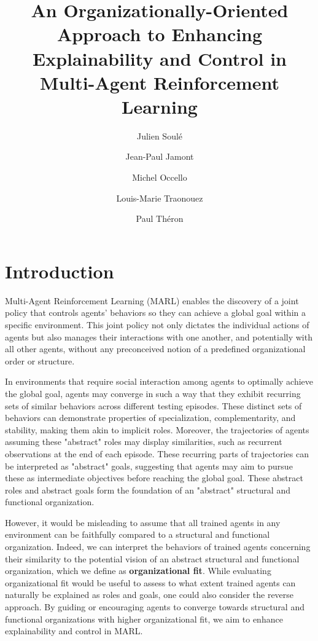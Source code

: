 \documentclass[sigconf,anonymous]{aamas}
\title[AAMAS-2025 CybMASDE]{An Organizationally-Oriented Approach to Enhancing Explainability and Control in Multi-Agent Reinforcement Learning}
\author{Julien Soulé}
\affiliation{
  \institution{Univ. Grenoble Alpes}
  \city{Valence}
  \country{France}}
\author{Jean-Paul Jamont}
\affiliation{
  \institution{Univ. Grenoble Alpes}
  \city{Valence}
  \country{France}}
\author{Michel Occello}
\affiliation{
  \institution{Univ. Grenoble Alpes}
  \city{Valence}
  \country{France}}
\author{Louis-Marie Traonouez}
\affiliation{
  \institution{Thales Land and Air Systems, BU IAS}
  \city{Rennes}
  \country{France}}
\author{Paul Théron}
\affiliation{
  \institution{AICA IWG}
  \city{La Guillermie}
  \country{France}}
\begin{document}

\pagestyle{fancy}
\fancyhead{}


\maketitle


\section{Introduction}

Multi-Agent Reinforcement Learning (MARL) enables the discovery of a joint policy that controls agents' behaviors so they can achieve a global goal within a specific environment. 
This joint policy not only dictates the individual actions of agents but also manages their interactions with one another, and potentially with all other agents, without any preconceived notion of a predefined organizational order or structure. 

In environments that require social interaction among agents to optimally achieve the global goal, agents may converge in such a way that they exhibit recurring sets of similar behaviors across different testing episodes. 
These distinct sets of behaviors can demonstrate properties of specialization, complementarity, and stability, making them akin to implicit roles. Moreover, the trajectories of agents assuming these "abstract" roles may display similarities, such as recurrent observations at the end of each episode. These recurring parts of trajectories can be interpreted as "abstract" goals, suggesting that agents may aim to pursue these as intermediate objectives before reaching the global goal. These abstract roles and abstract goals form the foundation of an "abstract" structural and functional organization.

However, it would be misleading to assume that all trained agents in any environment can be faithfully compared to a structural and functional organization. Indeed, we can interpret the behaviors of trained agents concerning their similarity to the potential vision of an abstract structural and functional organization, which we define as \textbf{organizational fit}.
While evaluating organizational fit would be useful to assess to what extent trained agents can naturally be explained as roles and goals, one could also consider the reverse approach. By guiding or encouraging agents to converge towards structural and functional organizations with higher organizational fit, we aim to enhance explainability and control in MARL.
\end{document}
